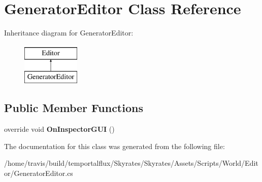 \hypertarget{class_generator_editor}{\section{Generator\-Editor Class Reference}
\label{class_generator_editor}
}
Inheritance diagram for Generator\-Editor\-:\begin{figure}[H]
\begin{center}
\leavevmode
\includegraphics[height=2.000000cm]{class_generator_editor}
\end{center}
\end{figure}
\subsection*{Public Member Functions}
\begin{DoxyCompactItemize}
\item 
\hypertarget{class_generator_editor_ae63afdf15cc675f63b723c13925e7a0d}{override void {\bfseries On\-Inspector\-G\-U\-I} ()}\label{class_generator_editor_ae63afdf15cc675f63b723c13925e7a0d}

\end{DoxyCompactItemize}


The documentation for this class was generated from the following file\-:\begin{DoxyCompactItemize}
\item 
/home/travis/build/temportalflux/\-Skyrates/\-Skyrates/\-Assets/\-Scripts/\-World/\-Editor/Generator\-Editor.\-cs\end{DoxyCompactItemize}
